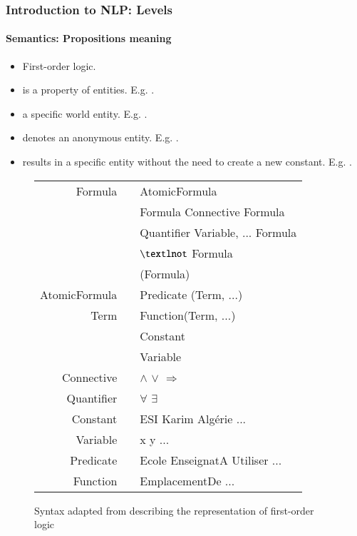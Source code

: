\documentclass[xcolor=table]{beamer}
\begin{document}
\begin{frame}
\frametitle{Introduction to NLP: Levels}
\framesubtitle{Semantics: Propositions meaning}

\begin{minipage}{0.5\textwidth}
\begin{itemize}
	\item First-order logic.
	\item {} is a property of entities. 
	E.g. .	
	\item {} a specific world entity.
	E.g. .
	\item {} denotes an anonymous entity. 
	E.g. .
	\item {} results in a specific entity without the need to create a new constant.
	E.g. .
\end{itemize}
\end{minipage}
\begin{minipage}{0.48\textwidth}
	\begin{figure}
		{\tiny\bfseries
		\begin{tabular}{rcl}
			\hline\hline
			Formula & \textrightarrow & AtomicFormula \\
			& \textbar        & Formula Connective Formula \\
			& \textbar        & Quantifier Variable, ... Formula \\
			& \textbar        & $\textlnot$ Formula \\
			& \textbar        & (Formula) \\
			AtomicFormula & \textrightarrow & Predicate (Term, ...) \\
			Term    & \textrightarrow & Function(Term, ...) \\
			& \textbar        & Constant \\
			& \textbar        & Variable \\
			Connective & \textrightarrow & $\wedge$ \textbar $\vee$ \textbar $\Rightarrow$ \\
			Quantifier & \textrightarrow & $\forall$ \textbar $\exists$ \\
			Constant & \textrightarrow & ESI \textbar Karim \textbar Algérie ...\\
			Variable & \textrightarrow & x \textbar y \textbar ... \\
			Predicate & \textrightarrow & Ecole \textbar EnseignatA \textbar Utiliser \textbar ... \\
			Function & \textrightarrow & EmplacementDe \textbar ... \\
			\hline\hline
		\end{tabular}
	}
		\caption{Syntax adapted from \cite{2002-russell-norvig} describing the representation of first-order logic \cite{2019-jurafsky-martin}}
	\end{figure}
\end{minipage}

\end{frame}
\end{document}
